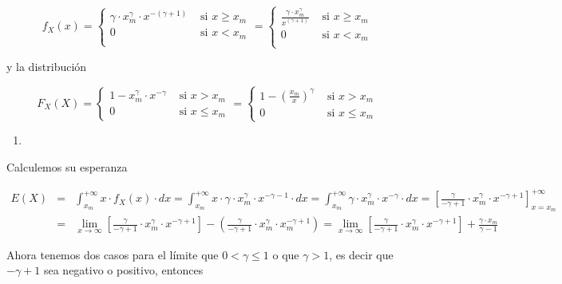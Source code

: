 \documentclass[
]{article}
\providecommand{\tightlist}{%
  \setlength{\itemsep}{0pt}\setlength{\parskip}{0pt}}
\begin{document}
\[
f_X(x)=\left\{
\begin{array}{ll}
\gamma\cdot x_m^{\gamma} \cdot  x^{-(\gamma+1)} &\mbox{ si } x\geq x_m\\
0 &\mbox{ si } x< x_m\\
\end{array}
\right.=
\left\{
\begin{array}{ll}
\frac{\gamma\cdot x_m^{\gamma}}{x^{(\gamma+1)}} &\mbox{ si } x\geq x_m\\
0 &\mbox{ si } x< x_m\\
\end{array}
\right.
\]

y la distribución

\[
F_X(X)=
\left\{
\begin{array}{ll}
1-  x_m^\gamma \cdot x^{-\gamma} & \mbox{ si } x>x_m\\
0 & \mbox{ si } x\leq x_m
\end{array}
\right.
=\left\{
\begin{array}{ll}
1-  \left(\frac{x_m}{x}\right)^{\gamma} & \mbox{ si } x>x_m\\
0 & \mbox{ si } x\leq x_m
\end{array}
\right.
\]

\begin{enumerate}
\def\labelenumi{\alph{enumi})}
\setcounter{enumi}{2}
\tightlist
\item
\end{enumerate}

Calculemos su esperanza

\begin{eqnarray*}
E(X)&=&\int_{x_m}^{+\infty} x\cdot f_X(x)\cdot dx=
\int_{x_m}^{+\infty} x\cdot \gamma\cdot x_m^{\gamma} \cdot  x^{-\gamma-1}\cdot dx=
\int_{x_m}^{+\infty} \gamma\cdot x_m^{\gamma} \cdot  x^{-\gamma}\cdot dx=
\left[\frac{\gamma}{-\gamma+1}\cdot x_m^{\gamma} \cdot  x^{-\gamma+1}\right]_{x=x_m}^{+\infty}
\\
&=& \lim_{x\to \infty} \left[\frac{\gamma}{-\gamma+1}\cdot x_m^{\gamma} \cdot  x^{-\gamma+1}\right] - \left(\frac{\gamma}{-\gamma+1} \cdot x_m^{\gamma} \cdot  x_m^{-\gamma+1}\right)=
\lim_{x\to \infty} \left[\frac{\gamma}{-\gamma+1}\cdot x_m^{\gamma} \cdot  x^{-\gamma+1}\right] + \frac{\gamma\cdot x_m}{\gamma-1}  
\end{eqnarray*}

Ahora tenemos dos casos para el límite que \(0<\gamma\leq 1\) o que
\(\gamma>1\), es decir que \(-\gamma+1\) sea negativo o positivo,
entonces
\end{document}
